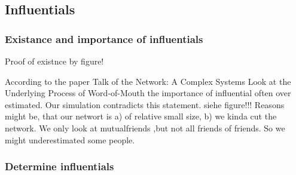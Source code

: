 \subsection{Influentials}

\subsubsection{Existance and importance of influentials}

Proof of existnce by figure!

According to the paper Talk of the Network: A Complex Systems Look at the Underlying Process of Word-of-Mouth the importance of influential often over estimated. Our simulation contradicts this statement. siehe figure!!! Reasons might be, that our networt is a) of relative small size, b) we kinda cut the network. We only look at mutualfriends ,but not all friends of friends. So we might underestimated some people. 

\subsubsection{Determine influentials}